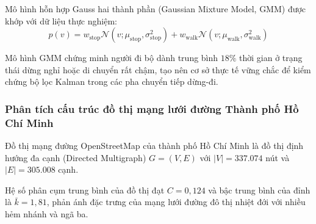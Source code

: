 Mô hình hỗn hợp Gauss hai thành phần (Gaussian Mixture Model, GMM) được khớp với dữ liệu thực nghiệm:
\begin{equation}
p(v) = w_{\text{stop}} \mathcal{N}(v; \mu_{\text{stop}}, \sigma_{\text{stop}}^2) + w_{\text{walk}} \mathcal{N}(v; \mu_{\text{walk}}, \sigma_{\text{walk}}^2)
\label{eq:gmm-velocity-distribution}
\end{equation}

Mô hình GMM chứng minh người đi bộ dành trung bình $18\%$ thời gian ở trạng thái dừng nghỉ hoặc di chuyển rất chậm, tạo nên cơ sở thực tế vững chắc để kiểm chứng bộ lọc Kalman trong các pha chuyển tiếp dừng-đi.

\subsubsection{Phân tích cấu trúc đồ thị mạng lưới đường Thành phố Hồ Chí Minh}

\hspace{0.5cm} Đồ thị mạng đường OpenStreetMap của thành phố Hồ Chí Minh là đồ thị định hướng đa cạnh (Directed Multigraph) $G = (V, E)$ với $|V| = 337.074$ nút và $|E| = 305.008$ cạnh.

\begin{table}[H]
\centering
\caption{Phân bố các phân cấp đường bộ và đặc tính vận tốc trong đồ thị mạng đường HCM}
\label{tab:osm-road-hierarchy}
\end{table}

Hệ số phân cụm trung bình của đồ thị đạt $C = 0{,}124$ và bậc trung bình của đỉnh là $\bar{k} = 1{,}81$, phản ánh đặc trưng của mạng lưới đường đô thị nhiệt đới với nhiều hẻm nhánh và ngã ba.

